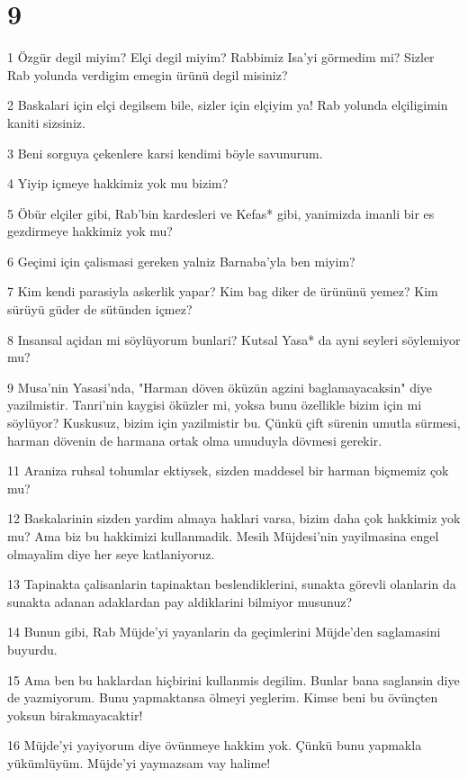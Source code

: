 \chapter{9}

\par 1 Özgür degil miyim? Elçi degil miyim? Rabbimiz Isa'yi görmedim mi? Sizler Rab yolunda verdigim emegin ürünü degil misiniz?
\par 2 Baskalari için elçi degilsem bile, sizler için elçiyim ya! Rab yolunda elçiligimin kaniti sizsiniz.
\par 3 Beni sorguya çekenlere karsi kendimi böyle savunurum.
\par 4 Yiyip içmeye hakkimiz yok mu bizim?
\par 5 Öbür elçiler gibi, Rab'bin kardesleri ve Kefas* gibi, yanimizda imanli bir es gezdirmeye hakkimiz yok mu?
\par 6 Geçimi için çalismasi gereken yalniz Barnaba'yla ben miyim?
\par 7 Kim kendi parasiyla askerlik yapar? Kim bag diker de ürününü yemez? Kim sürüyü güder de sütünden içmez?
\par 8 Insansal açidan mi söylüyorum bunlari? Kutsal Yasa* da ayni seyleri söylemiyor mu?
\par 9 Musa'nin Yasasi'nda, "Harman döven öküzün agzini baglamayacaksin" diye yazilmistir. Tanri'nin kaygisi öküzler mi, yoksa bunu özellikle bizim için mi söylüyor? Kuskusuz, bizim için yazilmistir bu. Çünkü çift sürenin umutla sürmesi, harman dövenin de harmana ortak olma umuduyla dövmesi gerekir.
\par 11 Araniza ruhsal tohumlar ektiysek, sizden maddesel bir harman biçmemiz çok mu?
\par 12 Baskalarinin sizden yardim almaya haklari varsa, bizim daha çok hakkimiz yok mu? Ama biz bu hakkimizi kullanmadik. Mesih Müjdesi'nin yayilmasina engel olmayalim diye her seye katlaniyoruz.
\par 13 Tapinakta çalisanlarin tapinaktan beslendiklerini, sunakta görevli olanlarin da sunakta adanan adaklardan pay aldiklarini bilmiyor musunuz?
\par 14 Bunun gibi, Rab Müjde'yi yayanlarin da geçimlerini Müjde'den saglamasini buyurdu.
\par 15 Ama ben bu haklardan hiçbirini kullanmis degilim. Bunlar bana saglansin diye de yazmiyorum. Bunu yapmaktansa ölmeyi yeglerim. Kimse beni bu övünçten yoksun birakmayacaktir!
\par 16 Müjde'yi yayiyorum diye övünmeye hakkim yok. Çünkü bunu yapmakla yükümlüyüm. Müjde'yi yaymazsam vay halime!
